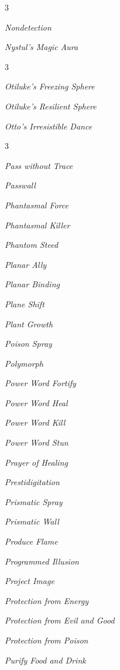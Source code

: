 \documentclass[10pt,a4paper,twoside,bg=print,twocolumn,openany,nodeprecatedcode]{dndbook}
\begin{document}
\begin{description}
\begin{multicols}{3}
\item \textit{Nondetection}
\item \textit{Nystul's Magic Aura}
\end{multicols}

\end{description}


\begin{description}
\begin{multicols}{3}
\item \textit{Otiluke's Freezing Sphere}
\item \textit{Otiluke's Resilient Sphere}
\item \textit{Otto's Irresistible Dance}
\end{multicols}

\end{description}


\begin{description}
\begin{multicols}{3}
\item \textit{Pass without Trace}
\item \textit{Passwall}
\item \textit{Phantasmal Force}
\item \textit{Phantasmal Killer}
\item \textit{Phantom Steed}
\item \textit{Planar Ally}
\item \textit{Planar Binding}
\item \textit{Plane Shift}
\item \textit{Plant Growth}
\item \textit{Poison Spray}
\item \textit{Polymorph}
\item \textit{Power Word Fortify}
\item \textit{Power Word Heal}
\item \textit{Power Word Kill}
\item \textit{Power Word Stun}
\item \textit{Prayer of Healing}
\item \textit{Prestidigitation}
\item \textit{Prismatic Spray}
\item \textit{Prismatic Wall}
\item \textit{Produce Flame}
\item \textit{Programmed Illusion}
\item \textit{Project Image}
\item \textit{Protection from Energy}
\item \textit{Protection from Evil and Good}
\item \textit{Protection from Poison}
\item \textit{Purify Food and Drink}
\end{multicols}

\end{description}
\end{document}
